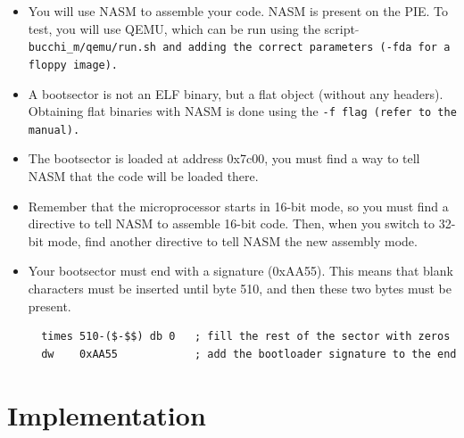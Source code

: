 \begin{itemize}
\item
  You will use NASM to assemble your code. NASM is present on the
  PIE. To test, you will use QEMU, which can be run using the script
  \tt $\tilde{}$bucchi\_m/qemu/run.sh \rm and adding the correct parameters
  (\tt -fda \rm for a floppy image).
\item
  A bootsector is not an ELF binary, but a flat object (without any
  headers). Obtaining flat binaries with NASM is done using the \tt -f \rm
  flag (refer to the manual).
\item
  The bootsector is loaded at address 0x7c00, you must find a way to
  tell NASM that the code will be loaded there.
\item
  Remember that the microprocessor starts in 16-bit mode, so you must
  find a directive to tell NASM to assemble 16-bit code. Then, when
  you switch to 32-bit mode, find another directive to tell NASM the
  new assembly mode.
\item
  Your bootsector must end with a signature (0xAA55). This means that
  blank characters must be inserted until byte 510, and then these two
  bytes must be present.
  \begin{verbatim}
  times 510-($-$$) db 0	  ; fill the rest of the sector with zeros
  dw    0xAA55            ; add the bootloader signature to the end
  \end{verbatim}
\end{itemize}

\newpage

\section*{Implementation}

